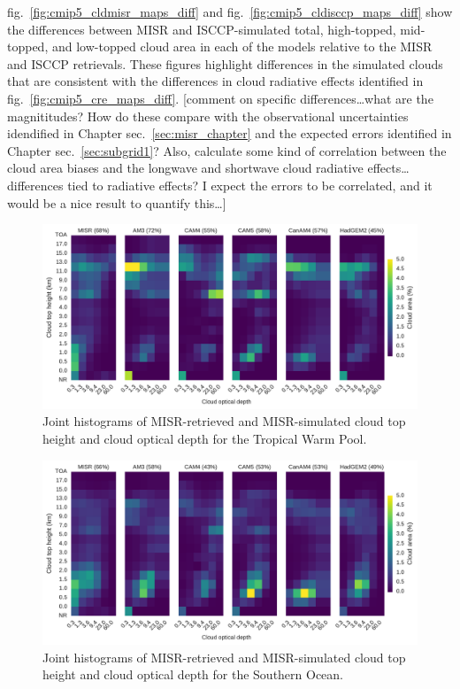 fig.~\ref{fig:cmip5_cldmisr_maps_diff} and
fig.~\ref{fig:cmip5_cldisccp_maps_diff} show the differences between
MISR and ISCCP-simulated total, high-topped, mid-topped, and low-topped
cloud area in each of the models relative to the MISR and ISCCP
retrievals. These figures highlight differences in the simulated clouds
that are consistent with the differences in cloud radiative effects
identified in fig.~\ref{fig:cmip5_cre_maps_diff}. {[}comment on specific
differences\ldots{}what are the magnititudes? How do these compare with
the observational uncertainties idendified in Chapter
sec.~\ref{sec:misr_chapter} and the expected errors identified in
Chapter sec.~\ref{sec:subgrid1}? Also, calculate some kind of
correlation between the cloud area biases and the longwave and shortwave
cloud radiative effects\ldots{}differences tied to radiative effects? I
expect the errors to be correlated, and it would be a nice result to
quantify this\ldots{}{]}

\begin{figure}[htbp]
\centering
\includegraphics{graphics/cmip5_clMISR_TropicalWarmPool.pdf}
\caption{\label{fig:cmip5_clMISR_TropicalWarmPool}Joint histograms of
MISR-retrieved and MISR-simulated cloud top height and cloud optical
depth for the Tropical Warm
Pool.}\label{fig:cmip5ux5fclMISRux5fTropicalWarmPool}
\end{figure}

\begin{figure}[htbp]
\centering
\includegraphics{graphics/cmip5_clMISR_SouthernOcean.pdf}
\caption{\label{fig:cmip5_clMISR_SouthernOcean}Joint histograms of
MISR-retrieved and MISR-simulated cloud top height and cloud optical
depth for the Southern
Ocean.}\label{fig:cmip5ux5fclMISRux5fSouthernOcean}
\end{figure}

